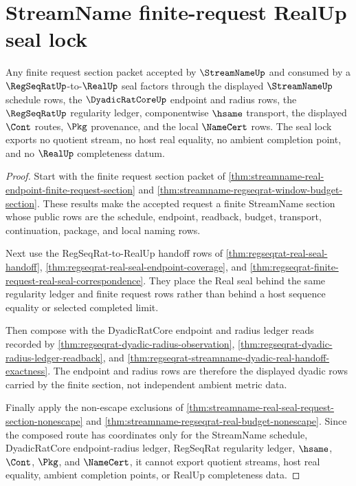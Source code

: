 \section{StreamName finite-request RealUp seal lock}
\label{sec:streamname-finite-request-real-seal-lock}

\begin{theorem}
\label{thm:streamname-finite-request-section-real-seal-lock}
Any finite request section packet accepted by $\StreamNameUp$ and consumed by a
$\RegSeqRatUp$-to-$\RealUp$ seal factors through the displayed
$\StreamNameUp$ schedule rows, the $\DyadicRatCoreUp$ endpoint and radius
rows, the $\RegSeqRatUp$ regularity ledger, componentwise $\hsame$ transport,
the displayed $\Cont$ routes, $\Pkg$ provenance, and the local $\NameCert$
rows. The seal lock exports no quotient stream, no host real equality, no
ambient completion point, and no $\RealUp$ completeness datum.
\end{theorem}
\begin{proof}
Start with the finite request section packet of
\autoref{thm:streamname-real-endpoint-finite-request-section} and
\autoref{thm:streamname-regseqrat-window-budget-section}. These results make
the accepted request a finite StreamName section whose public rows are the
schedule, endpoint, readback, budget, transport, continuation, package, and
local naming rows.

Next use the RegSeqRat-to-RealUp handoff rows of
\autoref{thm:regseqrat-real-seal-handoff},
\autoref{thm:regseqrat-real-seal-endpoint-coverage}, and
\autoref{thm:regseqrat-finite-request-real-seal-correspondence}. They place
the Real seal behind the same regularity ledger and finite request rows rather
than behind a host sequence equality or selected completed limit.

Then compose with the DyadicRatCore endpoint and radius ledger reads recorded
by \autoref{thm:regseqrat-dyadic-radius-observation},
\autoref{thm:regseqrat-dyadic-radius-ledger-readback}, and
\autoref{thm:regseqrat-streamname-dyadic-real-handoff-exactness}. The
endpoint and radius rows are therefore the displayed dyadic rows carried by
the finite section, not independent ambient metric data.

Finally apply the non-escape exclusions of
\autoref{thm:streamname-real-seal-request-section-nonescape} and
\autoref{thm:streamname-regseqrat-real-budget-nonescape}. Since the composed
route has coordinates only for the StreamName schedule, DyadicRatCore
endpoint-radius ledger, RegSeqRat regularity ledger, $\hsame$, $\Cont$,
$\Pkg$, and $\NameCert$, it cannot export quotient streams, host real
equality, ambient completion points, or RealUp completeness data.
\end{proof}

